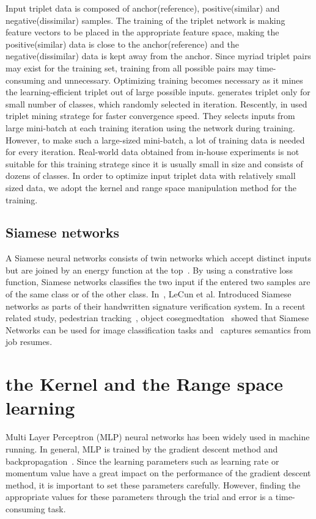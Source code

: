 Input triplet data is composed of anchor(reference), positive(similar) and negative(dissimilar) samples. The training of the triplet network is making feature vectors to be placed in the appropriate feature space, making the positive(similar) data is close to the anchor(reference) and the negative(dissimilar) data is kept away from the anchor.
Since myriad triplet pairs may exist for the training set, training from all possible pairs may time-consuming and unnecessary. Optimizing training becomes necessary as it mines the learning-efficient triplet out of large possible inputs.
\cite{cheng2016person,ding2015deep,wang2016joint} generates triplet only for small number of classes, which randomly selected in iteration.
Rescently, in \cite{schroff2015facenet} used triplet mining stratege for faster convergence speed. They selects inputs from large mini-batch at each training iteration using the network during training.
However, to make such a large-sized mini-batch, a lot of training data is needed for every iteration. Real-world data obtained from in-house experiments is not suitable for this training stratege since it is usually small in size and consists of dozens of classes.
In order to optimize input triplet data with relatively small sized data, we adopt the kernel and range space manipulation method for the training.

\subsection{Siamese networks}
A Siamese neural networks consists of twin networks which accept distinct inputs but are joined by an energy function at the top~\cite{koch2015siamese}. By using a constrative loss function, Siamese networks classifies the two input if the entered two samples are of the same class or of the other class.
In~\cite{bromley1994signature}, LeCun et al. Introduced Siamese networks as parts of their handwritten signature verification system.
In a recent related study, pedestrian tracking~\cite{Leal-Taixe_2016_CVPR_Workshops}, object cosegmedtation~\cite{mukherjee2018object} showed that Siamese Networks can be used for image classification tasks and~\cite{maheshwary2018matching} captures semantics from job resumes.

\section{the Kernel and the Range space learning}
Multi Layer Perceptron (MLP) neural networks has been widely used in machine running. In general, MLP is trained by the gradient descent method and backpropagation~\cite{goodfellow2016deep}.
Since the learning parameters such as learning rate or momentum value have a great impact on the performance of the gradient descent method, it is important to set these parameters carefully.
However, finding the appropriate values for these parameters through the trial and error is a time-consuming task.

